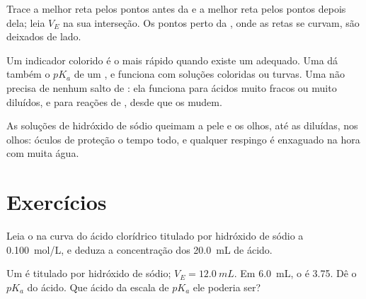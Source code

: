 \begin{method}\label{met:g12:ph-conductivity-titrations:two-lines}
Trace a melhor reta pelos pontos antes da  e a melhor reta
pelos pontos depois dela; leia $V_E$ na sua interseção. Os pontos perto
da , onde as retas se curvam, são deixados de lado.
\end{method}

\begin{remark}\label{rem:g12:ph-conductivity-titrations:which}
Um indicador colorido é o mais rápido quando existe um adequado. Uma
 dá também o $pK_a$ de um , e
funciona com soluções coloridas ou turvas. Uma 
não precisa de nenhum salto de : ela funciona para ácidos muito fracos
ou muito diluídos, e para reações de , desde que os 
mudem.
\end{remark}

\begin{safety}{}
As soluções de hidróxido de sódio queimam a pele e os olhos, até as
diluídas, nos olhos: óculos de proteção o tempo todo, e qualquer
respingo é enxaguado na hora com muita água.
\end{safety}

\section{Exercícios}


\begin{exercise}[$\star$]\label{exo:g12:ph-conductivity-titrations:1}
Leia o  na curva do ácido clorídrico titulado por
hidróxido de sódio a \qty{0.100}{mol/L}, e deduza a concentração dos
\qty{20.0}{mL} de ácido.
\end{exercise}

\begin{exercise}[$\star$]\label{exo:g12:ph-conductivity-titrations:2}
Um  é titulado por hidróxido de sódio; $V_E = \qty{12.0}{mL}$.
Em \qty{6.0}{mL}, o  é 3.75. Dê o $pK_a$ do ácido. Que ácido da escala
de $pK_a$ ele poderia ser?
\end{exercise}

